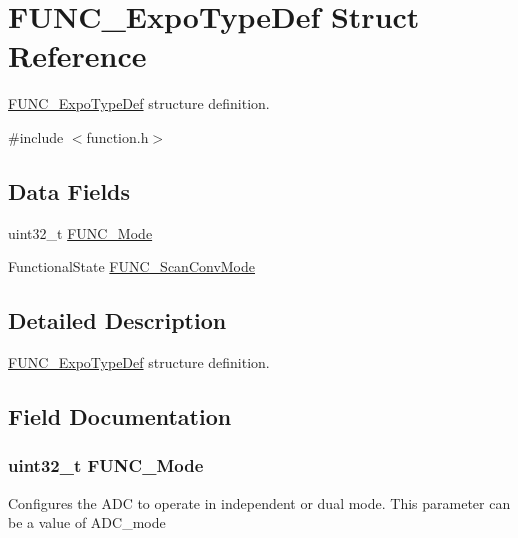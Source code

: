 \hypertarget{struct_f_u_n_c___expo_type_def}{}\section{F\+U\+N\+C\+\_\+\+Expo\+Type\+Def Struct Reference}
\label{struct_f_u_n_c___expo_type_def}


\hyperlink{struct_f_u_n_c___expo_type_def}{F\+U\+N\+C\+\_\+\+Expo\+Type\+Def} structure definition.  




{\ttfamily \#include $<$function.\+h$>$}

\subsection*{Data Fields}
\begin{DoxyCompactItemize}
\item 
uint32\+\_\+t \hyperlink{struct_f_u_n_c___expo_type_def_a814e9c0a2e62eaea6c35bc6d701232d2}{F\+U\+N\+C\+\_\+\+Mode}
\item 
Functional\+State \hyperlink{struct_f_u_n_c___expo_type_def_a107ceb2119e7b259a591eef448594980}{F\+U\+N\+C\+\_\+\+Scan\+Conv\+Mode}
\end{DoxyCompactItemize}


\subsection{Detailed Description}
\hyperlink{struct_f_u_n_c___expo_type_def}{F\+U\+N\+C\+\_\+\+Expo\+Type\+Def} structure definition. 

\subsection{Field Documentation}
\hypertarget{struct_f_u_n_c___expo_type_def_a814e9c0a2e62eaea6c35bc6d701232d2}{}
\subsubsection[{F\+U\+N\+C\+\_\+\+Mode}]{\setlength{\rightskip}{0pt plus 5cm}uint32\+\_\+t F\+U\+N\+C\+\_\+\+Mode}\label{struct_f_u_n_c___expo_type_def_a814e9c0a2e62eaea6c35bc6d701232d2}
Configures the A\+D\+C to operate in independent or dual mode. This parameter can be a value of A\+D\+C\+\_\+mode \hypertarget{struct_f_u_n_c___expo_type_def_a107ceb2119e7b259a591eef448594980}{}
